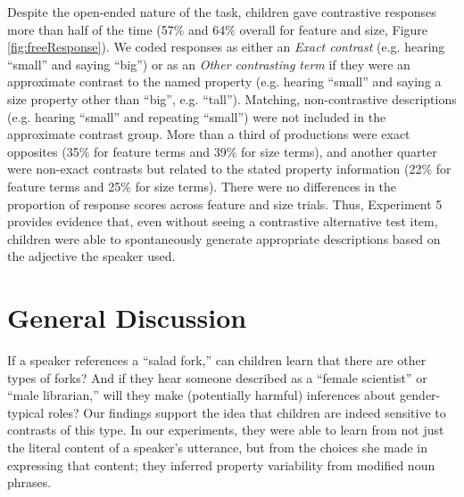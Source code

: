 \documentclass[man]{apa2}
\begin{document}
Despite the open-ended nature of the task, children gave contrastive responses more than half of the time (57\% and 64\% overall for feature and size, Figure \ref{fig:freeResponse}).  We coded responses as either an \emph{Exact contrast} (e.g. hearing ``small'' and saying ``big'') or as an \emph{Other contrasting term} if they were an approximate contrast to the named property (e.g. hearing ``small'' and saying a size property other than ``big'', e.g. ``tall''). Matching, non-contrastive descriptions (e.g. hearing ``small'' and repeating ``small'') were not included in the approximate contrast group. More than a third of productions were exact opposites (35\% for feature terms and 39\% for size terms), and another quarter were non-exact contrasts but related to the stated property information (22\% for feature terms and 25\% for size terms). There were no differences in the proportion of response scores across feature and size trials. Thus, Experiment 5 provides evidence that, even without seeing a contrastive alternative test item, children were able to spontaneously generate appropriate descriptions based on the adjective the speaker used. 

\section{General Discussion}

If a speaker references a ``salad fork,'' can children learn that there are other types of forks? And if they hear someone described as a ``female scientist'' or ``male librarian,'' will they make (potentially harmful) inferences about gender-typical roles? Our findings support the idea that children are indeed sensitive to contrasts of this type. In our experiments, they were able to learn from not just the literal content of a speaker's utterance, but from the choices she made in expressing that content; they inferred property variability from modified noun phrases.
\end{document}
